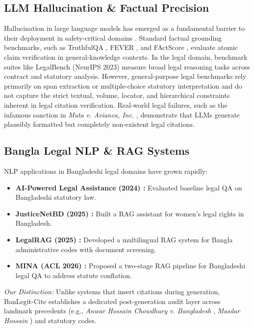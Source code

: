 \documentclass[conference]{IEEEtran}
\begin{document}
\subsection{LLM Hallucination \& Factual Precision}
Hallucination in large language models has emerged as a fundamental barrier to their deployment in safety-critical domains \cite{halueval}. Standard factual grounding benchmarks, such as TruthfulQA \cite{truthfulqa}, FEVER \cite{fever}, and FActScore \cite{factscore}, evaluate atomic claim verification in general-knowledge contexts. In the legal domain, benchmark suites like LegalBench (NeurIPS 2023) \cite{legalbench2023} measure broad legal reasoning tasks across contract and statutory analysis. However, general-purpose legal benchmarks rely primarily on span extraction or multiple-choice statutory interpretation and do not capture the strict textual, volume, locator, and hierarchical constraints inherent in legal citation verification. Real-world legal failures, such as the infamous sanction in \textit{Mata v. Avianca, Inc.} \cite{mata2023}, demonstrate that LLMs generate plausibly formatted but completely non-existent legal citations.

\subsection{Bangla Legal NLP \& RAG Systems}
NLP applications in Bangladeshi legal domains have grown rapidly:
\begin{itemize}
\item \textbf{AI-Powered Legal Assistance (2024) \cite{ukildb2024}:} Evaluated baseline legal QA on Bangladeshi statutory law.
\item \textbf{JusticeNetBD (2025) \cite{justicenetbd2025}:} Built a RAG assistant for women's legal rights in Bangladesh.
\item \textbf{LegalRAG (2025) \cite{legalrag2025}:} Developed a multilingual RAG system for Bangla administrative codes with document screening.
\item \textbf{MINA (ACL 2026) \cite{mina2026}:} Proposed a two-stage RAG pipeline for Bangladeshi legal QA to address statute conflation.
\end{itemize}

\textit{Our Distinction:} Unlike systems that insert citations during generation, BanLegit-Cite establishes a dedicated post-generation audit layer across landmark precedents (e.g., \textit{Anwar Hossain Chowdhury v. Bangladesh} \cite{anwarhossain}, \textit{Masdar Hossain} \cite{masdarhossain}) and statutory codes.
\end{document}
